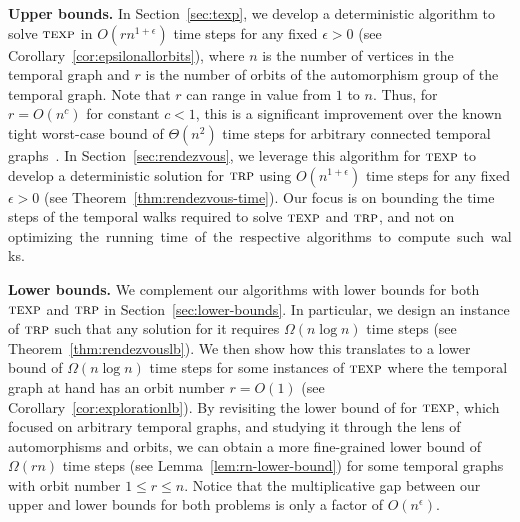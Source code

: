 \documentclass[10pt,a4paper]{article}
\newcommand{\trp}{\textsc{trp}}
\newcommand{\texp}{\textsc{texp}}
\begin{document}
\begin{sloppypar}
\textbf{Upper bounds.} 
In Section~\ref{sec:texp}, we develop a deterministic algorithm to solve $\texp$
in $O(r n^{1+\epsilon})$ time steps for any fixed $\epsilon >0$ (see
Corollary~\ref{cor:epsilonallorbits}), where $n$ is the number of vertices in
the temporal graph and $r$ is the number of orbits of the automorphism group of
the temporal graph. Note that $r$ can range in value from $1$ to $n$. Thus, for
$r=O(n^c)$ for constant $c<1$, this is a significant improvement over the known
tight worst-case bound of $\Theta(n^2)$ time steps for
arbitrary connected temporal graphs~\cite{ErlebachHK21}. %
In Section~\ref{sec:rendezvous}, {we leverage this algorithm for $\texp$ to
develop a deterministic solution for $\trp$ using} $O(n^{1+\epsilon})$ time
steps for any fixed $\epsilon > 0$ (see Theorem~\ref{thm:rendezvous-time}). 
Our focus is on bounding the time steps of the temporal walks required to
solve $\texp$ and $\trp$, and not on \mbox{optimizing the running time of the
respective algorithms to compute such walks.}
\end{sloppypar}

\textbf{Lower bounds.} 
We complement our algorithms with lower bounds for both $\texp$ and $\trp$ in
Section~\ref{sec:lower-bounds}. In particular, we design an instance of $\trp$
such that any solution for it requires $\Omega(n \log n)$ time steps (see
Theorem~\ref{thm:rendezvouslb}). We then show how this translates to a lower
bound of $\Omega(n \log n)$ time steps for {some instances of $\texp$ where
the temporal graph at hand has an orbit number $r=O(1)$ (see
Corollary~\ref{cor:explorationlb})}. By revisiting the lower bound of
\cite{ErlebachHK21} for $\texp$, which focused on arbitrary temporal graphs, and
studying it through the lens of automorphisms and orbits, we can obtain a more
fine-grained lower bound of $\Omega(rn)$ time steps (see
Lemma~\ref{lem:rn-lower-bound}) for {some temporal graphs with orbit number
$1\le r \le n$.} Notice that the {multiplicative} gap between our upper and lower bounds for both
problems is only {a factor of} $O(n^\epsilon)$.
\end{document}
